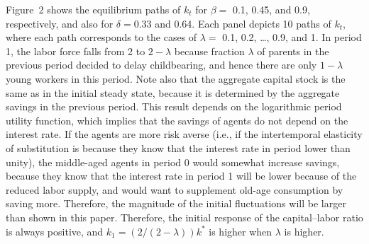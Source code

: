 \documentclass[nogrid]{MBE}%
\begin{document}
{%

Figure~2 shows the equilibrium paths of $k_{t}$ for $\beta=$ 0.1, 0.45, and 0.9, respectively, and
also for $\delta=0.33$ and 0.64. Each panel depicts 10 paths of $k_{t}$, where each path
corresponds to the cases of $\lambda=$ 0.1, 0.2, \dots, 0.9, and 1. In period 1, the labor force
falls from 2 to $2-\lambda$ because fraction $\lambda$ of parents in the previous period decided
to delay childbearing, and hence there are only $1-\lambda$ young workers in this period. Note
also that the aggregate capital stock is the same as in the initial steady state, because it is
determined by the aggregate savings in the previous period. {This result depends on the
logarithmic period utility function, which implies that the savings of agents do not depend on the
interest rate. If the agents are more risk averse (i.e., if the intertemporal elasticity of
substitution is because they know that the interest rate in period lower than unity), the
middle-aged agents in period 0 would somewhat increase savings, because they know that the
interest rate in period 1 will be lower because of the reduced labor supply, and would want to
supplement old-age consumption by saving more. Therefore, the magnitude of the initial
fluctuations will be larger than shown in this paper.} Therefore, the initial response of the
capital--labor ratio is always positive, and $k_{1}=\left( 2/(2-\lambda)\right)  k^{*}$ is higher
when $\lambda$ is higher.

}
\end{document}

